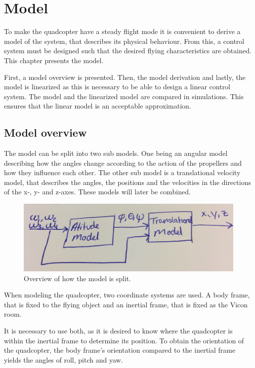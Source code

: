 \chapter{Model}
To make the quadcopter have a steady flight mode it is convenient to derive a model of the system, that describes its physical behaviour. From this, a control system must be designed such that the desired flying characteristics are obtained. 
This chapter presents the model. 

First, a model overview is presented. Then, the model derivation and lastly, the model is linearized as this is necessary to be able to design a linear control system. The model and the linearized model are compared in simulations. This ensures that the linear model is an acceptable approximation.

\section{Model overview}
The model can be split into two sub models. One being an angular model describing how the angles change according to the action of the propellers and how they influence each other. The other sub model is a translational velocity model, that describes the angles, the positions and the velocities in the directions of the x-, y- and z-axes. 
These models will later be combined. 
\begin{figure}[H]
\centering
\includegraphics[scale=0.1]{figures/modeloverview.PNG}
\caption{Overview of how the model is split.}
\label{sss}
\end{figure}
When modeling the quadcopter, two coordinate systems are used. A body frame, that is fixed to the flying object and an inertial frame, that is fixed as the Vicon room. 

It is necessary to use both, as it is desired to know where the quadcopter is within the inertial frame to determine its position. To obtain the orientation of the quadcopter, the body frame's orientation compared to the inertial frame yields the angles of roll, pitch and yaw. 

